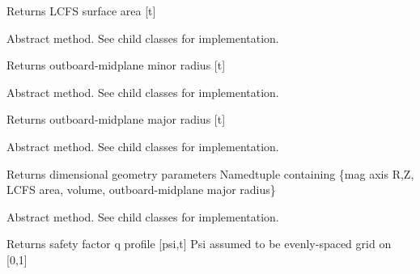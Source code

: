 \documentclass[letterpaper,10pt,english]{sphinxmanual}
\begin{document}
\begin{fulllineitems}
\begin{fulllineitems}
Returns LCFS surface area {[}t{]}

\end{fulllineitems}


\begin{fulllineitems}
\label{eqtools:eqtools.core.Equilibrium.getAOut}
Abstract method.  See child classes for implementation.

Returns outboard-midplane minor radius {[}t{]}

\end{fulllineitems}


\begin{fulllineitems}
\label{eqtools:eqtools.core.Equilibrium.getRmidOut}
Abstract method.  See child classes for implementation.

Returns outboard-midplane major radius {[}t{]}

\end{fulllineitems}


\begin{fulllineitems}
\label{eqtools:eqtools.core.Equilibrium.getGeometry}
Abstract method.  See child classes for implementation.

Returns dimensional geometry parameters
Namedtuple containing \{mag axis R,Z, LCFS area, volume, outboard-midplane major radius\}

\end{fulllineitems}


\begin{fulllineitems}
\label{eqtools:eqtools.core.Equilibrium.getQProfile}
Abstract method.  See child classes for implementation.

Returns safety factor q profile {[}psi,t{]}
Psi assumed to be evenly-spaced grid on {[}0,1{]}

\end{fulllineitems}



\end{fulllineitems}
\end{document}
